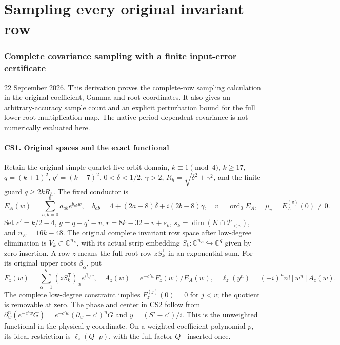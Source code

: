 \documentclass[11pt]{article}
\begin{document}
\clearpage\part{Sampling every original invariant row}
\section{Complete covariance sampling with a finite input-error certificate}\label{complete-covariance-sampling-with-a-finite-input-error-certificate}

22 September 2026. This derivation proves the complete-row sampling calculation in the original coefficient, Gamma and root coordinates. It also gives an arbitrary-accuracy sample count and an explicit perturbation bound for the full lower-root multiplication map. The native period-dependent covariance is not numerically evaluated here.

\subsection{CS1. Original spaces and the exact functional}\label{cs1.-original-spaces-and-the-exact-functional}

Retain the original simple-quartet five-orbit domain, \(k\equiv1\pmod4\), \(k\ge17\), \(q=(k+1)^2\), \(q'=(k-7)^2\), \(0<\delta<1/2\), \(\gamma>2\), \(R_h=\sqrt{\delta^2+\gamma^2}\), and the finite guard \(q\ge2kR_h\). The fixed conductor is \[
 E_A(w)=\sum_{a,b=0}^8a_{ab}e^{b_{ab}w},\quad
 b_{ab}=4+(2a-8)\delta+i(2b-8)\gamma,
 \quad v=\operatorname{ord}_0E_A,\quad\mu_v=E_A^{(v)}(0)\ne0.
 \tag{CS1}
\] Set \(c'=k/2-4\), \(g=q-q'-v\), \(r=8k-32-v+s_k\), \(s_k=\dim(K\cap\mathcal P_{<v})\), and \(n_E=16k-48\). The original complete invariant row space after low-degree elimination is \(V_k\subset\mathbb C^{n_E}\), with its actual strip embedding \(S_k:\mathbb C^{n_E}\hookrightarrow\mathbb C^q\) given by zero insertion. A row \(z\) means the full-root row \(zS_k^{\mathsf T}\) in an exponential sum. For its original upper roots \(\beta_\alpha\), put \[
 F_z(w)=\sum_{\alpha=1}^q(zS_k^{\mathsf T})_\alpha e^{\beta_\alpha w},
 \quad A_z(w)=e^{-c'w}F_z(w)/E_A(w),
 \quad\ell_z(y^n)=(-i)^nn![w^n]A_z(w).
 \tag{CS2}
\] The complete low-degree constraint implies \(F_z^{(j)}(0)=0\) for \(j<v\); the quotient is removable at zero. The phase and center in CS2 follow from \(\partial_w^n(e^{-c'w}G)=e^{-c'w}(\partial_w-c')^nG\) and \(y=(S'-c')/i\). This is the unweighted functional in the physical \(y\) coordinate. On a weighted coefficient polynomial \(p\), its ideal restriction is \(\ell_z(Q_-p)\), with the full factor \(Q_-\) inserted once.
\end{document}
